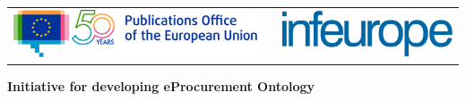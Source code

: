 

\newcommand{\DelAcronym}{ePO}
\newcommand{\DelTitle}{{eProcurement} UML conceptual model conventions}
\newcommand{\DelNumber}{WP 1.2}
\newcommand{\DelVersion}{1.0}
\newcommand{\DelAuthor}{Eugeniu Costetchi}
\newcommand{\DelDate}{17 April 2020}
\newcommand{\DelFilename}{wp1-3-uml-conventions}
\newcommand{\DelInitiative}{Initiative for developing eProcurement Ontology}


\pagestyle{empty}


\begin{titlepage}
\begin{center}

\begin{center}
	\begin{center}
		\setlength{\tabcolsep}{0pt}
		\begin{tabular}{>{\raggedleft}m{3.5cm}>{\centering}m{\dimexpr\textwidth - 8cm\relax}>{\raggedright}m{3.5cm}}
			\includegraphics[width=1.15\linewidth]{images/logos/OP-50years-EN}%
			&%
			&%
			\includegraphics[width=\linewidth]{images/logos/infeurope-blue-logo} %
		\end{tabular}
	\end{center}


  \vspace{2mm}

  \end{center}
  \vspace{4cm}
  \textbf{{\large \DelInitiative\\}}
  \vspace{2cm}
  

\end{center}
\end{titlepage}
